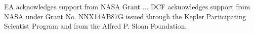 \documentclass[graybox,natbib,nosecnum]{svmult}
\begin{document}





%


\begin{acknowledgement}
EA acknowledges support from NASA Grant ...  DCF acknowledges support from NASA under Grant No. NNX14AB87G issued through the Kepler Participating Scientist Program and from the Alfred P. Sloan Foundation.
\end{acknowledgement}

\end{document}
